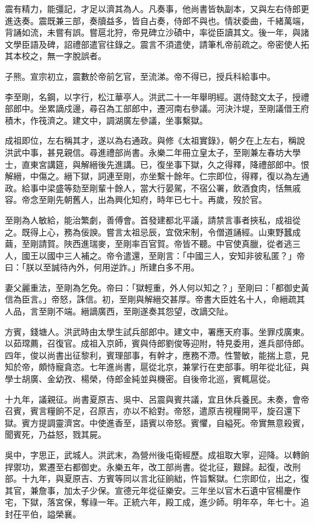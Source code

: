 \begin{pinyinscope}
震有精力，能彊記，才足以濟其為人。凡奏事，他尚書皆執副本，又與左右侍郎更進迭奏。震既兼三部，奏牘益多，皆自占奏，侍郎不與也。情狀委曲，千緒萬端，背誦如流，未嘗有誤。嘗扈北狩，帝見碑立沙磧中，率從臣讀其文。後一年，與諸文學臣語及碑，詔禮部遣官往錄之。震言不須遣使，請筆札帝前疏之。帝密使人拓其本校之，無一字脫誤者。

子熊。宣宗初立，震數於帝前乞官，至流涕。帝不得已，授兵科給事中。

李至剛，名鋼，以字行，松江華亭人。洪武二十一年舉明經。選侍懿文太子，授禮部郎中。坐累謫戍邊，尋召為工部郎中，遷河南右參議。河決汴堤，至剛議借王府積木，作筏濟之。建文中，調湖廣左參議，坐事繫獄。

成祖即位，左右稱其才，遂以為右通政。與修《太祖實錄》，朝夕在上左右，稱說洪武中事，甚見親信。尋進禮部尚書。永樂二年冊立皇太子，至剛兼左春坊大學士，直東宮講筵，與解縉後先進講。已，復坐事下獄，久之得釋，降禮部郎中。恨解縉，中傷之。縉下獄，詞連至剛，亦坐繫十餘年。仁宗即位，得釋，復以為左通政。給事中梁盛等劾至剛輩十餘人，當大行晏駕，不宿公署，飲酒食肉，恬無戚容。帝念至剛先朝舊人，出為興化知府，時年已七十。再歲，歿於官。

至剛為人敏給，能治繁劇，善傅會。首發建都北平議，請禁言事者挾私，成祖從之。既得上心，務為佞諛。嘗言太祖忌辰，宜傚宋制，令僧道誦經。山東野蠶成繭，至剛請賀。陜西進瑞麥，至剛率百官賀。帝皆不聽。中官使真臘，從者逃三人，國王以國中三人補之。帝令遣還，至剛言：「中國三人，安知非彼私匿？」帝曰：「朕以至誠待內外，何用逆詐。」所建白多不用。

妻父麗重法，至剛為乞免。帝曰：「獄輕重，外人何以知之？」至剛曰：「都御史黃信為臣言。」帝怒，誅信。初，至剛與解縉交甚厚。帝書大臣姓名十人，命縉疏其人品，言至剛不端。縉謫廣西，至剛遂奏其怨望，改謫交阯。

方賓，錢塘人。洪武時由太學生試兵部郎中。建文中，署應天府事。坐罪戍廣東。以茹瑺薦，召復官。成祖入京師，賓與侍郎劉俊等迎附，特見委用，進兵部侍郎。四年，俊以尚書出征黎利，賓理部事，有幹才，應務不滯。性警敏，能揣上意，見知於帝，頗恃寵貪恣。七年進尚書，扈從北京，兼掌行在吏部事。明年從北征，與學士胡廣、金幼孜、楊榮，侍郎金純並與機密。自後帝北巡，賓輒扈從。

十九年，議親征。尚書夏原吉、吳中、呂震與賓共議，宜且休兵養民。未奏，會帝召賓，賓言糧餉不足，召原吉，亦以不給對。帝怒，遣原吉視糧開平，旋召還下獄。賓方提調靈濟宮。中使進香至，語賓以帝怒。賓懼，自縊死。帝實無意殺賓，聞賓死，乃益怒，戮其屍。

吳中，字思正，武城人。洪武末，為營州後屯衛經歷。成祖取大寧，迎降。以轉餉捍禦功，累遷至右都御史。永樂五年，改工部尚書。從北征，艱歸。起復，改刑部。十九年，與夏原吉、方賓等同以言北征餉絀，忤旨繫獄。仁宗即位，出之，復其官，兼詹事，加太子少保。宣德元年從征樂安。三年坐以官木石遺中官楊慶作宅，下獄，落宮保，奪祿一年。正統六年，殿工成，進少師。明年卒，年七十。追封茌平伯，謚榮襄。


\end{pinyinscope}
